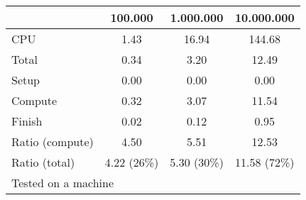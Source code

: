 \begin{tabular}{l*{3}{c}}\toprule
& 100.000 &         1.000.000 &       10.000.000 \\ \midrule
CPU &     1.43 &     16.94 &    144.68 \\
Total &     0.34 &      3.20 &     12.49 \\
\hspace{2mm} Setup &     0.00 &      0.00 &      0.00 \\
\hspace{2mm} Compute &     0.32 &      3.07 &     11.54 \\
\hspace{2mm} Finish &     0.02 &      0.12 &      0.95 \\
\midrule Ratio (compute) &     4.50 &      5.51 &     12.53 \\
Ratio (total) &     4.22 (26\%) &      5.30 (30\%) &     11.58 (72\%) \\
\bottomrule
\multicolumn{4}{l}{\footnotesize Tested on a \unix1 machine}
\end{tabular}

\endinput